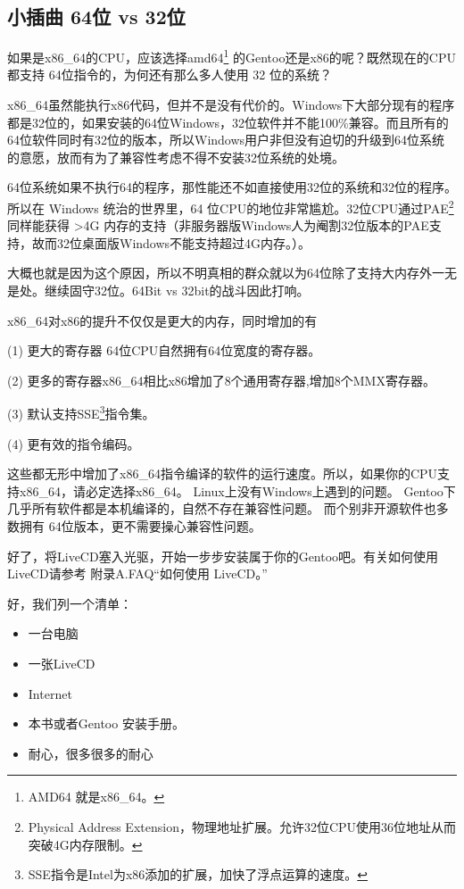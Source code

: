 \documentclass[amstex]{ctexbook}
\newenvironment{insertnote}{ \ttfamily\CJKfamily{KaiTi} }{\vskip 1cm }
\begin{document}
\begin{insertnote}
\subsection*{小插曲  64位 vs 32位}

如果是x86\_64的CPU，应该选择amd64\footnote{AMD64 就是x86\_64。}
的Gentoo还是x86的呢？既然现在的CPU都支持 64位指令的，为何还有那么多人使用 32 位的系统？

x86\_64虽然能执行x86代码，但并不是没有代价的。Windows下大部分现有的程序都是32位的，如果安装的64位Windows，32位软件并不能100\%兼容。而且所有的64位软件同时有32位的版本，所以Windows用户非但没有迫切的升级到64位系统的意愿，放而有为了兼容性考虑不得不安装32位系统的处境。

64位系统如果不执行64的程序，那性能还不如直接使用32位的系统和32位的程序。所以在 Windows 统治的世界里，64 位CPU的地位非常尴尬。32位CPU通过PAE\footnote{Physical Address Extension，物理地址扩展。允许32位CPU使用36位地址从而突破4G内存限制。}同样能获得 >4G 内存的支持（非服务器版Windows人为阉割32位版本的PAE支持，故而32位桌面版Windows不能支持超过4G内存。）。

大概也就是因为这个原因，所以不明真相的群众就以为64位除了支持大内存外一无是处。继续固守32位。64Bit vs 32bit的战斗因此打响。

x86\_64对x86的提升不仅仅是更大的内存，同时增加的有

(1)  更大的寄存器 64位CPU自然拥有64位宽度的寄存器。

(2)  更多的寄存器x86\_64相比x86增加了8个通用寄存器,增加8个MMX寄存器。

(3)  默认支持SSE\footnote{SSE指令是Intel为x86添加的扩展，加快了浮点运算的速度。}指令集。

(4)  更有效的指令编码。

这些都无形中增加了x86\_64指令编译的软件的运行速度。所以，如果你的CPU支持x86\_64，请必定选择x86\_64。
Linux上没有Windows上遇到的问题。
Gentoo下几乎所有软件都是本机编译的，自然不存在兼容性问题。
而个别非开源软件也多数拥有 64位版本，更不需要操心兼容性问题。
\end{insertnote}



好了，将LiveCD塞入光驱，开始一步步安装属于你的Gentoo吧。有关如何使用LiveCD请参考 附录A.FAQ“如何使用 LiveCD。”

好，我们列一个清单：


\begin{itemize}
\item[ \checked] 一台电脑
\item[ \checked] 一张LiveCD
\item[ \checked] Internet
\item[ \checked] 本书或者Gentoo 安装手册。
\item[ \checked] 耐心，很多很多的耐心
\end{itemize}
\end{document}
